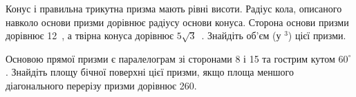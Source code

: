 \documentclass[12pt]{article}
\begin{document}
\begin{samepage}
\noindent\zadnum Конус і правильна трикутна призма мають рівні висоти. Радіус кола, описаного навколо основи призми дорівнює радіусу основи конуса. Сторона основи призми дорівнює 12~, а твірна конуса дорівнює $5\sqrt{3}$~. Знайдіть об’єм (у $^3$) цієї призми. 

\nmtnobreak
\nopagebreak\nbvspace{0.5cm}
\nmtAnswerBox
\par{}
\end{samepage}

\begin{samepage}
\noindent\zadnum Основою прямої призми є паралелограм зі сторонами 8 і 15 та гострим кутом $60^\circ$. Знайдіть площу бічної поверхні цієї призми, якщо площа меншого діагонального перерізу призми дорівнює 260. 

\nmtnobreak
\nopagebreak\nbvspace{0.5cm}
\nmtAnswerBox
\par{}
\end{samepage}
\end{document}
